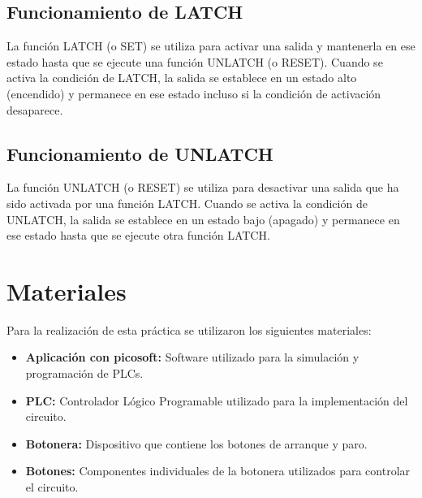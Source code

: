 \documentclass[12pt]{report}
\begin{document}
\subsection{Funcionamiento de LATCH}
La función LATCH (o SET) se utiliza para activar una salida y mantenerla en ese estado hasta que se ejecute una función UNLATCH (o RESET). Cuando se activa la condición de LATCH, la salida se establece en un estado alto (encendido) y permanece en ese estado incluso si la condición de activación desaparece.

\subsection{Funcionamiento de UNLATCH}
La función UNLATCH (o RESET) se utiliza para desactivar una salida que ha sido activada por una función LATCH. Cuando se activa la condición de UNLATCH, la salida se establece en un estado bajo (apagado) y permanece en ese estado hasta que se ejecute otra función LATCH.



\section{Materiales}
Para la realización de esta práctica se utilizaron los siguientes materiales:

\begin{itemize}
  \item \textbf{Aplicación con picosoft:} Software utilizado para la simulación y programación de PLCs.
  \item \textbf{PLC:} Controlador Lógico Programable utilizado para la implementación del circuito.
  \item \textbf{Botonera:} Dispositivo que contiene los botones de arranque y paro.
  \item \textbf{Botones:} Componentes individuales de la botonera utilizados para controlar el circuito.
\end{itemize}
\end{document}

